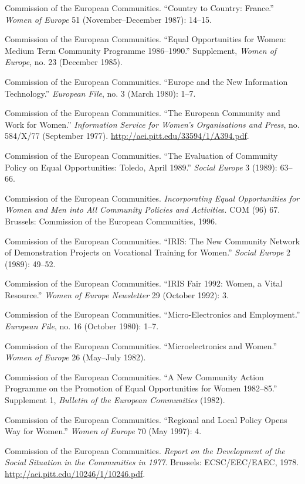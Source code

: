 \documentclass{tufte-handout}
\begin{document}
\begin{hangparas}{.25in}{1}
Commission of the European Communities. ``Country to Country: France.''
\emph{Women of Europe} 51 (November--December 1987): 14--15.

Commission of the European Communities. ``Equal Opportunities for Women:
Medium Term Community Programme 1986--1990.'' Supplement, \emph{Women of
Europe}, no. 23 (December 1985).

Commission of the European Communities. ``Europe and the New Information
Technology.'' \emph{European File}, no. 3 (March 1980): 1--7.

Commission of the European Communities. ``The European Community and
Work for Women.'' \emph{Information Service for Women's Organisations
and Press}, no. 584/X/77 (September 1977).
\url{http://aei.pitt.edu/33594/1/A394.pdf}.

Commission of the European Communities. ``The Evaluation of Community
Policy on Equal Opportunities: Toledo, April 1989.'' \emph{Social
Europe} 3 (1989): 63--66.

Commission of the European Communities. \emph{Incorporating Equal
Opportunities for Women and Men into All Community Policies and
Activitie}s. COM (96) 67. Brussels: Commission of the European
Communities, 1996.

Commission of the European Communities. ``IRIS: The New Community
Network of Demonstration Projects on Vocational Training for Women.''
\emph{Social Europe} 2 (1989): 49--52.

Commission of the European Communities. ``IRIS Fair 1992: Women, a Vital
Resource.'' \emph{Women of Europe Newsletter} 29 (October 1992): 3.

Commission of the European Communities. ``Micro-Electronics and
Employment.'' \emph{European File}, no. 16 (October 1980): 1--7.

Commission of the European Communities. ``Microelectronics and Women.''
\emph{Women of Europe} 26 (May--July 1982).

Commission of the European Communities. ``A New Community Action
Programme on the Promotion of Equal Opportunities for Women 1982--85.''
Supplement 1, \emph{Bulletin of the European Communities} (1982).

Commission of the European Communities. ``Regional and Local Policy
Opens Way for Women.'' \emph{Women of Europe} 70 (May 1997): 4.

Commission of the European Communities. \emph{Report on the Development
of the Social Situation in the Communities in 1977}. Brussels:
ECSC/EEC/EAEC, 1978. \url{http://aei.pitt.edu/10246/1/10246.pdf}.


\end{hangparas}
\end{document}
